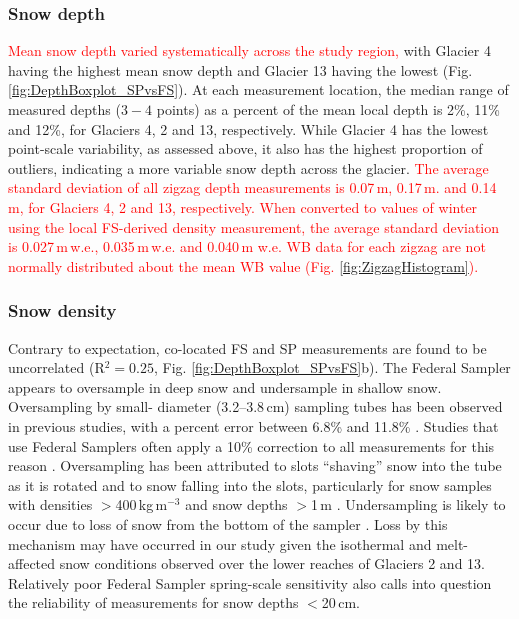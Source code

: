 \documentclass[review,oneside, letterpaper]{igs}
\begin{document}
\subsubsection{Snow depth}
\textcolor{red}{Mean snow depth varied systematically across the study region,} with Glacier 4 having the highest mean snow depth and Glacier 13 having the lowest (Fig. \ref{fig:DepthBoxplot_SPvsFS}). At each measurement location, the median range of measured depths ($3-4$ points) as a percent of the mean local depth is 2\%, 11\% and 12\%, for Glaciers 4, 2 and 13, respectively. While Glacier 4 has the lowest point-scale variability, as assessed above, it also has the highest proportion of outliers, indicating a more variable snow depth across the glacier. \textcolor{red}{The average standard deviation of all zigzag depth measurements is 0.07\,m, 0.17\,m. and 0.14\,m, for Glaciers 4, 2 and 13, respectively. When converted to values of winter using the local FS-derived density measurement, the average standard deviation is 0.027\,m\,w.e., 0.035\,m\,w.e. and 0.040\,m w.e. WB data for each zigzag are not normally distributed about the mean WB value (Fig. \ref{fig:ZigzagHistogram}).}

\subsubsection{Snow density}

Contrary to expectation, co-located FS and SP measurements are found to be uncorrelated (R$^2=0.25$, Fig. \ref{fig:DepthBoxplot_SPvsFS}b). The Federal Sampler appears to oversample in deep snow and undersample in shallow snow. Oversampling by small- diameter (3.2--3.8\,cm) sampling tubes has been observed in previous studies, with a percent error between 6.8\% and 11.8\% \citep[e.g.][]{Work1965, Fames1982, Conger2009}. Studies that use Federal Samplers often apply a 10\% correction to all measurements for this reason \citep[e.g.][]{Molotch2005}. Oversampling has been attributed to slots ``shaving'' snow into the tube as it is rotated \citep[e.g.][]{Dixon2012} and to snow falling into the slots, particularly for snow samples with densities $>$400\,kg\,m$^{-3}$ and snow depths $>$1\,m \citep[e.g.][]{Beaumont1963}. Undersampling is likely to occur due to loss of snow from the bottom of the sampler \citep{Turcan1975}. Loss by this mechanism may have occurred in our study given the isothermal and melt-affected snow conditions observed over the lower reaches of Glaciers 2 and 13. Relatively poor Federal Sampler spring-scale sensitivity also calls into question the reliability of measurements for snow depths $<$20\,cm.
\end{document}
